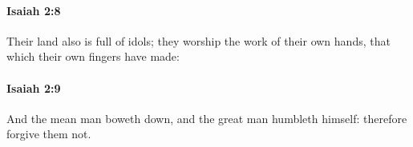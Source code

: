 		\paragraph{Isaiah 2:8} %
			\label{ISAIAH-2-8}

			Their land also is full of idols; they worship the work of their own hands, that which their own fingers have made:


		\paragraph{Isaiah 2:9} %
			\label{ISAIAH-2-9}

			And the mean man boweth down, and the great man humbleth himself: therefore forgive them not.


